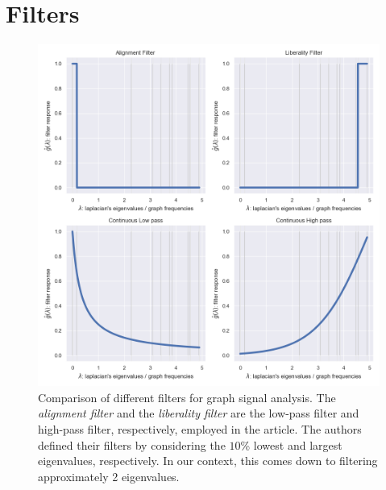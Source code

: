 \section{Filters}

\begin{figure}
    \centering
    \includegraphics{img/plot_filters.png}
    \caption{Comparison of different filters for graph signal analysis. The \textit{alignment filter} and the \textit{liberality filter} are the low-pass filter and high-pass filter, respectively, employed in the article\cite{huang_graph_2018}. The authors defined their filters by considering the $10$\% lowest and largest eigenvalues, respectively.  In our context, this comes down to filtering approximately 2 eigenvalues.}
    \label{fig:filt}
\end{figure}


